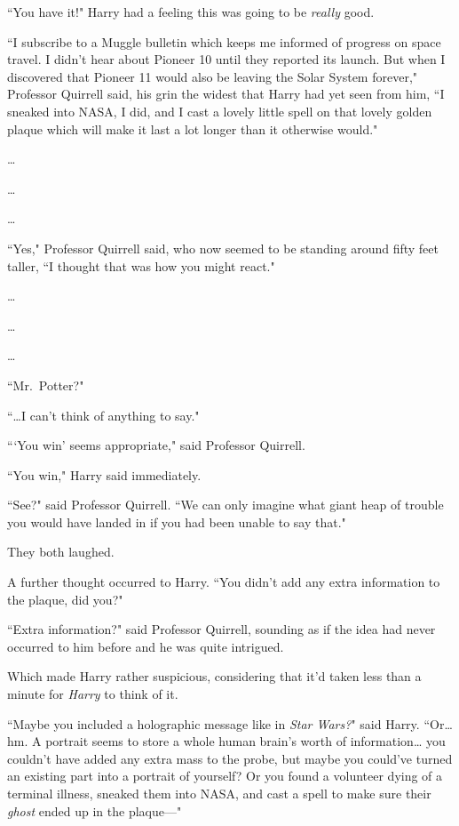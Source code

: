 ``You have it!" Harry had a feeling this was going to be \emph{really} good.

``I subscribe to a Muggle bulletin which keeps me informed of progress on space travel. I didn't hear about Pioneer 10 until they reported its launch. But when I discovered that Pioneer 11 would also be leaving the Solar System forever," Professor Quirrell said, his grin the widest that Harry had yet seen from him, ``I sneaked into NASA, I did, and I cast a lovely little spell on that lovely golden plaque which will make it last a lot longer than it otherwise would."

{\ldots}

{\ldots}

{\ldots}

``Yes," Professor Quirrell said, who now seemed to be standing around fifty feet taller, ``I thought that was how you might react."

{\ldots}

{\ldots}

{\ldots}

``Mr.~Potter?"

``{\ldots}I can't think of anything to say."

``{}`You win' seems appropriate," said Professor Quirrell.

``You win," Harry said immediately.

``See?" said Professor Quirrell. ``We can only imagine what giant heap of trouble you would have landed in if you had been unable to say that."

They both laughed.

A further thought occurred to Harry. ``You didn't add any extra information to the plaque, did you?"

``Extra information?" said Professor Quirrell, sounding as if the idea had never occurred to him before and he was quite intrigued.

Which made Harry rather suspicious, considering that it'd taken less than a minute for \emph{Harry} to think of it.

``Maybe you included a holographic message like in \emph{Star Wars?}" said Harry. ``Or{\ldots} hm. A portrait seems to store a whole human brain's worth of information{\ldots} you couldn't have added any extra mass to the probe, but maybe you could've turned an existing part into a portrait of yourself? Or you found a volunteer dying of a terminal illness, sneaked them into NASA, and cast a spell to make sure their \emph{ghost} ended up in the plaque—"

